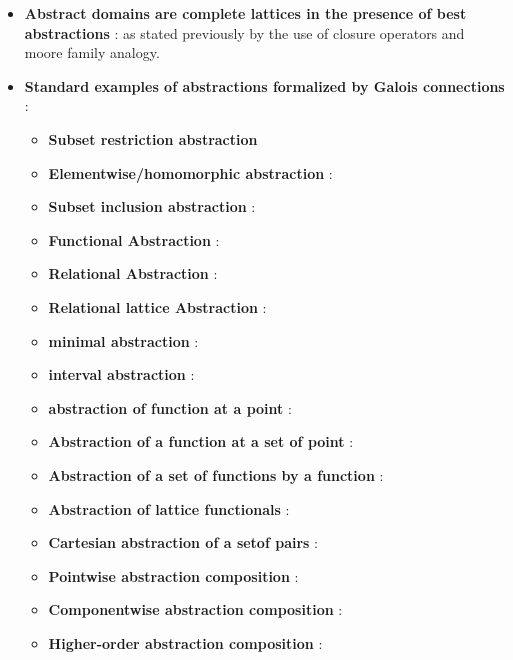 \begin{itemize}
	\item{\textbf{Abstract domains are complete lattices in the presence of best abstractions} : as stated previously by the use of closure operators and moore family analogy.
	}

	\item{\textbf{Standard examples of abstractions formalized by Galois connections} : 

	\begin{itemize}

		\item{\textbf{Subset restriction abstraction}}

		\item{\textbf{Elementwise/homomorphic abstraction} :
		}

		\item{\textbf{Subset inclusion abstraction} :
		}

		\item{\textbf{Functional Abstraction} :
		}

		\item{\textbf{Relational Abstraction} :
		}

		\item{\textbf{Relational lattice Abstraction} :
		}

		\item{\textbf{minimal abstraction} :
		}

		\item{\textbf{interval abstraction} :
		}

		\item{\textbf{abstraction of function at a point} :
		}

		\item{\textbf{Abstraction of a function at a set of point} :
		}

		\item{\textbf{Abstraction of a set of functions by a function} :
		}

		\item{\textbf{Abstraction of lattice functionals} :
		}

		\item{\textbf{Cartesian abstraction of a setof pairs} :
		}

		\item{\textbf{Pointwise abstraction composition} :
		}

		\item{\textbf{Componentwise abstraction composition} :
		}

		\item{\textbf{Higher-order abstraction composition} :
		}

	\end{itemize}
	}

\end{itemize}